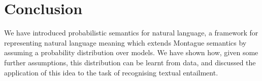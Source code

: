 \documentclass[letterpaper]{article}
\begin{document}
\section{Conclusion}

We have introduced probabilistic semantics for natural language, a
framework for representing natural language meaning which extends
Montague semantics by assuming a probability distribution over
models. We have shown how, given some further assumptions, this
distribution can be learnt from data, and discussed the application of
this idea to the task of recognising textual entailment.




\end{document}
